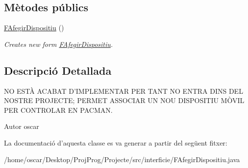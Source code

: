 \subsection*{Mètodes públics}
\begin{DoxyCompactItemize}
\item 
\hypertarget{classinterficie_1_1_f_afegir_dispositiu_a587fa9fb0219ca9bf3db91a8249bd75c}{\hyperlink{classinterficie_1_1_f_afegir_dispositiu_a587fa9fb0219ca9bf3db91a8249bd75c}{F\+Afegir\+Dispositiu} ()}\label{classinterficie_1_1_f_afegir_dispositiu_a587fa9fb0219ca9bf3db91a8249bd75c}

\begin{DoxyCompactList}\small\item\em Creates new form \hyperlink{classinterficie_1_1_f_afegir_dispositiu}{F\+Afegir\+Dispositiu}. \end{DoxyCompactList}\end{DoxyCompactItemize}


\subsection{Descripció Detallada}
N\+O E\+S\+TÀ A\+C\+A\+B\+A\+T D'I\+M\+P\+L\+E\+M\+E\+N\+T\+A\+R P\+E\+R T\+A\+N\+T N\+O E\+N\+T\+R\+A D\+I\+N\+S D\+E\+L N\+O\+S\+T\+R\+E P\+R\+O\+J\+E\+C\+T\+E; P\+E\+R\+M\+E\+T A\+S\+S\+O\+C\+I\+A\+R U\+N N\+O\+U D\+I\+S\+P\+O\+S\+I\+T\+I\+U MÒ\+V\+I\+L P\+E\+R C\+O\+N\+T\+R\+O\+L\+A\+R E\+N P\+A\+C\+M\+A\+N. 

\begin{DoxyAuthor}{Autor}
oscar 
\end{DoxyAuthor}


La documentació d'aquesta classe es va generar a partir del següent fitxer\+:\begin{DoxyCompactItemize}
\item 
/home/oscar/\+Desktop/\+Proj\+Prog/\+Projecte/src/interficie/F\+Afegir\+Dispositiu.\+java\end{DoxyCompactItemize}
